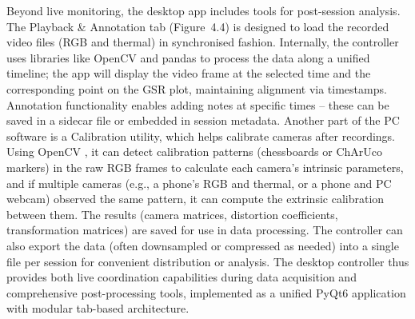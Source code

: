 Beyond live monitoring, the desktop app includes tools for post-session analysis. The Playback \& Annotation tab (Figure~4.4) is designed to load the recorded video files (RGB and thermal) in synchronised fashion. Internally, the controller uses libraries like OpenCV and pandas to process the data along a unified timeline; the app will display the video frame at the selected time and the corresponding point on the GSR plot, maintaining alignment via timestamps. Annotation functionality enables adding notes at specific times -- these can be saved in a sidecar file or embedded in session metadata. Another part of the PC software is a Calibration utility, which helps calibrate cameras after recordings. Using OpenCV \cite{ref22}, it can detect calibration patterns (chessboards or ChArUco markers) in the raw RGB frames to calculate each camera's intrinsic parameters, and if multiple cameras (e.g., a phone's RGB and thermal, or a phone and PC webcam) observed the same pattern, it can compute the extrinsic calibration between them. The results (camera matrices, distortion coefficients, transformation matrices) are saved for use in data processing. The controller can also export the data (often downsampled or compressed as needed) into a single file per session for convenient distribution or analysis. The desktop controller thus provides both live coordination capabilities during data acquisition and comprehensive post-processing tools, implemented as a unified PyQt6 application with modular tab-based architecture.

